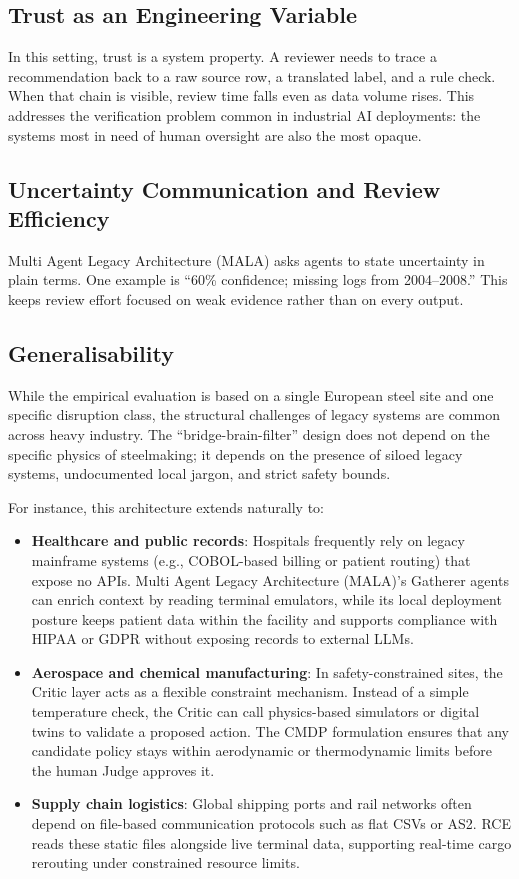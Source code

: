 \documentclass[conference]{IEEEtran}
\newcommand{\MALA}{Multi Agent Legacy Architecture (MALA)}
\begin{document}
\subsection{Trust as an Engineering Variable}

In this setting, trust is a system property. A reviewer needs to trace a recommendation back to a raw source row, a translated label, and a rule check. When that chain is visible, review time falls even as data volume rises. This addresses the verification problem common in industrial AI deployments: the systems most in need of human oversight are also the most opaque.

\subsection{Uncertainty Communication and Review Efficiency}

\MALA{} asks agents to state uncertainty in plain terms. One example is ``60\% confidence; missing logs from 2004--2008.'' This keeps review effort focused on weak evidence rather than on every output.

\subsection{Generalisability}

While the empirical evaluation is based on a single European steel site and one specific disruption class, the structural challenges of legacy systems are common across heavy industry. The ``bridge-brain-filter'' design does not depend on the specific physics of steelmaking; it depends on the presence of siloed legacy systems, undocumented local jargon, and strict safety bounds.

For instance, this architecture extends naturally to:
\begin{itemize}
  \item \textbf{Healthcare and public records}: Hospitals frequently rely on legacy mainframe systems (e.g., COBOL-based billing or patient routing) that expose no APIs. \MALA{}'s Gatherer agents can enrich context by reading terminal emulators, while its local deployment posture keeps patient data within the facility and supports compliance with HIPAA or GDPR without exposing records to external LLMs.
  \item \textbf{Aerospace and chemical manufacturing}: In safety-constrained sites, the Critic layer acts as a flexible constraint mechanism. Instead of a simple temperature check, the Critic can call physics-based simulators or digital twins to validate a proposed action. The CMDP formulation ensures that any candidate policy stays within aerodynamic or thermodynamic limits before the human Judge approves it.
  \item \textbf{Supply chain logistics}: Global shipping ports and rail networks often depend on file-based communication protocols such as flat CSVs or AS2. RCE reads these static files alongside live terminal data, supporting real-time cargo rerouting under constrained resource limits.
\end{itemize}
\end{document}
